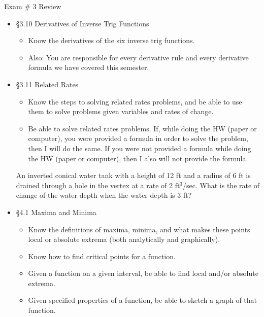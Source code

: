 \documentclass[cal1spr16Lectures.tex]{subfiles}
\begin{document}
\begin{frame}[allowframebreaks]{Exam \# 3 Review}\small
\begin{itemize}
\item \S 3.10 Derivatives of Inverse Trig Functions
\begin{itemize}\footnotesize
	\item Know the derivatives of the six inverse trig functions.
	\item Also: You are responsible for every derivative rule and every derivative formula we have covered this semester.
\end{itemize} 
%
\item \S 3.11 Related Rates
\begin{itemize}\footnotesize
	\item Know the steps to solving related rates problems, and be able to use them to solve problems given variables and rates of change.
	\item Be able to solve related rates problems.  If, while doing the HW (paper or computer), you were provided a formula in order to solve the problem, then I will do the same.  If you were not provided a formula while doing the HW (paper or computer), then I also will not provide the formula.
\end{itemize}
\begin{exe} An inverted conical water tank with a height of 12 ft and a radius of 6 ft is drained through a hole in the vertex at a rate of 2 ft$^{\text{3}}$/sec.  What is the rate of change of the water depth when the water depth is 3 ft? \end{exe}
\item \S 4.1 Maxima and Minima
	\begin{itemize}\footnotesize
	\item Know the definitions of maxima, minima, and what makes these points local or absolute extrema (both analytically and graphically).
	\item Know how to find critical points for a function.
	\item Given a function on a given interval, be able to find local and/or absolute extrema.
	\item Given specified properties of a function, be able to sketch a graph of that function.

\end{itemize}
\end{itemize}
\end{frame}
\end{document}
